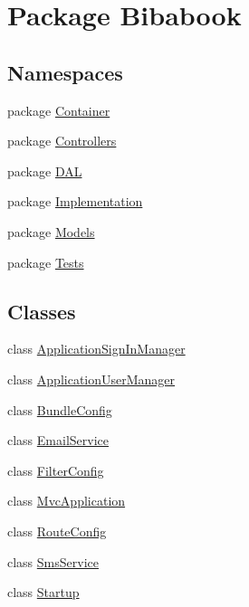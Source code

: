 \hypertarget{namespace_bibabook}{}\section{Package Bibabook}
\label{namespace_bibabook}
\subsection*{Namespaces}
\begin{DoxyCompactItemize}
\item 
package \hyperlink{namespace_bibabook_1_1_container}{Container}
\item 
package \hyperlink{namespace_bibabook_1_1_controllers}{Controllers}
\item 
package \hyperlink{namespace_bibabook_1_1_d_a_l}{D\+A\+L}
\item 
package \hyperlink{namespace_bibabook_1_1_implementation}{Implementation}
\item 
package \hyperlink{namespace_bibabook_1_1_models}{Models}
\item 
package \hyperlink{namespace_bibabook_1_1_tests}{Tests}
\end{DoxyCompactItemize}
\subsection*{Classes}
\begin{DoxyCompactItemize}
\item 
class \hyperlink{class_bibabook_1_1_application_sign_in_manager}{Application\+Sign\+In\+Manager}
\item 
class \hyperlink{class_bibabook_1_1_application_user_manager}{Application\+User\+Manager}
\item 
class \hyperlink{class_bibabook_1_1_bundle_config}{Bundle\+Config}
\item 
class \hyperlink{class_bibabook_1_1_email_service}{Email\+Service}
\item 
class \hyperlink{class_bibabook_1_1_filter_config}{Filter\+Config}
\item 
class \hyperlink{class_bibabook_1_1_mvc_application}{Mvc\+Application}
\item 
class \hyperlink{class_bibabook_1_1_route_config}{Route\+Config}
\item 
class \hyperlink{class_bibabook_1_1_sms_service}{Sms\+Service}
\item 
class \hyperlink{class_bibabook_1_1_startup}{Startup}
\end{DoxyCompactItemize}
